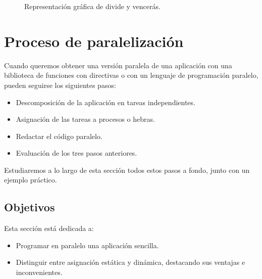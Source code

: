 \begin{figure}[H]
\centering
{}
\caption{Representación gráfica de divide y vencerás.}
\label{graph:dyv}
\end{figure}


\newpage
\section{Proceso de paralelización}
Cuando queremos obtener una versión paralela de una aplicación con una biblioteca de funciones con directivas o con un lenguaje de programación paralelo, pueden seguirse los siguientes pasos:
\begin{itemize}
    \item Descomposición de la aplicación en tareas independientes.
    \item Asignación de las tareas a procesos o hebras. 
    \item Redactar el código paralelo. 
    \item Evaluación de los tres pasos anteriores.
\end{itemize}
Estudiaremos a lo largo de esta sección todos estos pasos a fondo, junto con un ejemplo práctico.

\subsection{Objetivos}
Esta sección está dedicada a:
\begin{itemize}
    \item Programar en paralelo una aplicación sencilla.
    \item Distinguir entre asignación estática y dinámica, destacando sus ventajas e inconvenientes.
\end{itemize}

